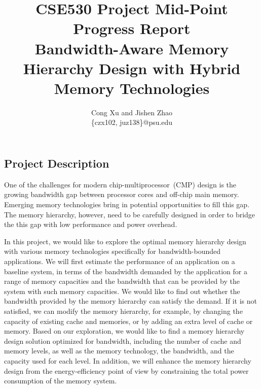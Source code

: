 \documentclass[10pt,letterpaper,singlecolumn]{article}
\begin{document}
\title{CSE530 Project Mid-Point Progress Report\\
Bandwidth-Aware Memory Hierarchy Design with Hybrid Memory Technologies}

\author{Cong Xu and Jishen Zhao\\
\{czx102, juz138\}@psu.edu\vspace{-10pt}
}
\maketitle

\begin{large}


\section{Project Description}

One of the challenges for modern chip-multiprocessor~(CMP) design is the growing bandwidth gap
between processor cores and off-chip main memory. Emerging memory technologies
bring in potential opportunities to fill this gap. The memory hierarchy,
however, need to be carefully designed in order to bridge the this gap with low
performance and power overhead.

In this project, we would like to explore the optimal memory hierarchy design
with various memory technologies specifically for bandwidth-bounded
applications. We will first estimate the performance of an application on a
baseline system, in terms of the bandwidth demanded by the application for a
range of memory capacities and the bandwidth that can be provided by the system
with such memory capacities. We would like to find out whether the bandwidth
provided by the memory hierarchy can satisfy the demand. If it is not satisfied,
we can modify the memory hierarchy, for example, by changing the capacity of
existing cache and memories, or by adding an extra level of cache or memory.
Based on our exploration, we would like to find a memory hierarchy design
solution optimized for bandwidth, including the number of cache and memory
levels, as well as the memory technology, the bandwidth, and the capacity used
for each level. In addition, we will enhance the memory hierarchy design from
the energy-efficiency point of view by constraining the total power consumption
of the memory system.\vspace{0.15in}


\end{large}
\end{document}
